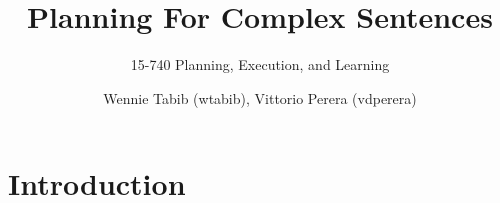 \documentclass{scrartcl}
\title{Planning For Complex Sentences}
\subtitle{15-740 Planning, Execution, and Learning}
\author{Wennie Tabib (wtabib), Vittorio Perera (vdperera)}
\begin{document}
\maketitle

\section{Introduction}
\end{document}
